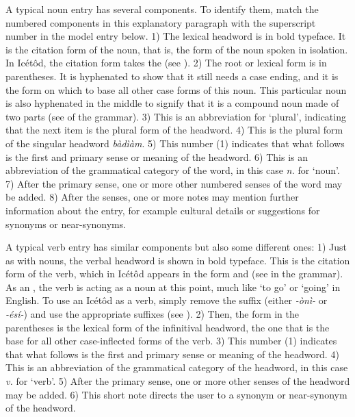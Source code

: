 A typical noun entry has several components. To identify them, match the numbered components in this explanatory paragraph with the superscript number in the model entry below. 1) The lexical headword is in bold typeface. It is the citation form of the noun, that is, the form of the noun spoken in isolation. In Icétôd, the citation form takes the  (see ). 2) The root or lexical form is in parentheses. It is hyphenated to show that it still needs a case ending, and it is the form on which to base all other case forms of this noun. This particular noun is also hyphenated in the middle to signify that it is a compound noun made of two parts (see  of the grammar). 3) This is an abbreviation for ‘plural’, indicating that the next item is the plural form of the headword. 4) This is the plural form of the singular headword \textit{bàdìàm}. 5) This number (1) indicates that what follows is the first and primary sense or meaning of the headword. 6) This is an abbreviation of the grammatical category of the word, in this case \textit{n.} for ‘noun’. 7) After the primary sense, one or more other numbered senses of the word may be added. 8) After the senses, one or more notes may mention further information about the entry, for example cultural details or suggestions for synonyms or near-synonyms.


A typical verb entry has similar components but also some different ones: 1) Just as with nouns, the verbal headword is shown in bold typeface. This is the citation form of the verb, which in Icétôd appears in the  form and  (see  in the grammar). As an , the verb is acting as a noun at this point, much like ‘to go’ or ‘going’ in English. To use an Icétôd  as a verb, simply remove the  suffix (either \textit{-ònì- }or \textit{-ésí-}) and use the appropriate suffixes (see ). 2) Then, the form in the parentheses is the lexical form of the infinitival headword, the one that is the base for all other case-inflected forms of the verb. 3) This number (1) indicates that what follows is the first and primary sense or meaning of the headword. 4) This is an abbreviation of the grammatical category of the headword, in this case \textit{v. }for ‘verb’. 5) After the primary sense, one or more other senses of the headword may be added. 6) This short note directs the user to a synonym or near-synonym of the headword.

